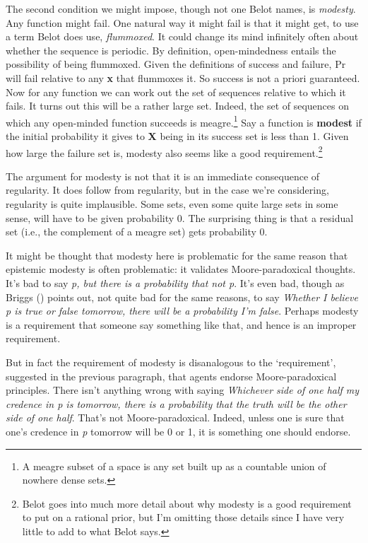 \documentclass[
  11pt,
  letterpaper,
  DIV=11,
  numbers=noendperiod,
  twoside]{scrartcl}
\begin{document}
The second condition we might impose, though not one Belot names, is
\emph{modesty}. Any function might fail. One natural way it might fail
is that it might get, to use a term Belot does use, \emph{flummoxed}. It
could change its mind infinitely often about whether the sequence is
periodic. By definition, open-mindedness entails the possibility of
being flummoxed. Given the definitions of success and failure, Pr will
fail relative to any \textbf{x} that flummoxes it. So success is not a
priori guaranteed. Now for any function we can work out the set of
sequences relative to which it fails. It turns out this will be a rather
large set. Indeed, the set of sequences on which any open-minded
function succeeds is meagre.\footnote{A meagre subset of a space is any
  set built up as a countable union of nowhere dense sets.} Say a
function is \textbf{modest} if the initial probability it gives to
\textbf{X} being in its success set is less than 1. Given how large the
failure set is, modesty also seems like a good requirement.\footnote{Belot
  goes into much more detail about why modesty is a good requirement to
  put on a rational prior, but I'm omitting those details since I have
  very little to add to what Belot says.}

The argument for modesty is not that it is an immediate consequence of
regularity. It does follow from regularity, but in the case we're
considering, regularity is quite implausible. Some sets, even some quite
large sets in some sense, will have to be given probability 0. The
surprising thing is that a residual set (i.e., the complement of a
meagre set) gets probability 0.

It might be thought that modesty here is problematic for the same reason
that epistemic modesty is often problematic: it validates
Moore-paradoxical thoughts. It's bad to say \emph{p, but there is a
probability that not p}. It's even bad, though as Briggs
() points out, not quite bad for the same
reasons, to say \emph{Whether I believe p is true or false tomorrow,
there will be a probability I'm false}. Perhaps modesty is a requirement
that someone say something like that, and hence is an improper
requirement.

But in fact the requirement of modesty is disanalogous to the
`requirement', suggested in the previous paragraph, that agents endorse
Moore-paradoxical principles. There isn't anything wrong with saying
\emph{Whichever side of one half my credence in p is tomorrow, there is
a probability that the truth will be the other side of one half}. That's
not Moore-paradoxical. Indeed, unless one is sure that one's credence in
\emph{p} tomorrow will be 0 or 1, it is something one should endorse.
\end{document}
